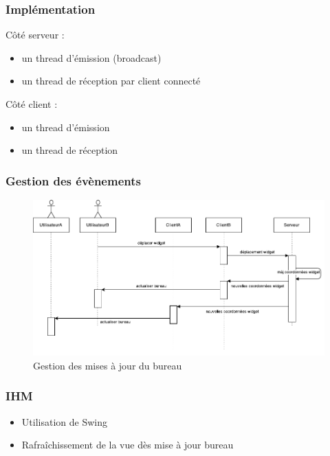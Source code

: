 \begin{frame}
	\frametitle{Implémentation}
	Côté serveur :
	\begin{itemize}
		\item un thread d'émission (broadcast)
		\item un thread de réception par client connecté
	\end{itemize}

	Côté client :
	\begin{itemize}
		\item un thread d'émission
		\item un thread de réception
	\end{itemize}

\end{frame}

\begin{frame}
	\frametitle{Gestion des évènements}
	\begin{figure}
		\includegraphics[scale=0.7]{resources/DI2.pdf}
		\caption{Gestion des mises à jour du bureau}
	\end{figure}
\end{frame}

\begin{frame}
	\frametitle{IHM}
	\begin{itemize}
		\item Utilisation de Swing
		\item Rafraîchissement de la vue dès mise à jour bureau
	\end{itemize}
\end{frame}